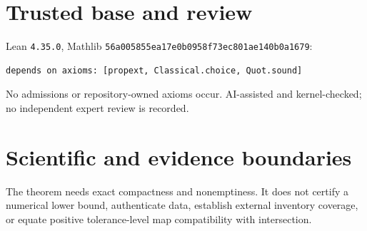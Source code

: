 \documentclass[11pt]{article}
\begin{document}
\section{Trusted base and review}
Lean \texttt{4.35.0}, Mathlib
\texttt{56a005855ea17e0b0958f73ec801ae140b0a1679}:
\begin{lstlisting}
depends on axioms: [propext, Classical.choice, Quot.sound]
\end{lstlisting}
No admissions or repository-owned axioms occur. AI-assisted and kernel-checked; no
independent expert review is recorded.
\section{Scientific and evidence boundaries}
The theorem needs exact compactness and nonemptiness. It does not certify a numerical
lower bound, authenticate data, establish external inventory coverage, or equate positive
tolerance-level map compatibility with intersection.
\end{document}
